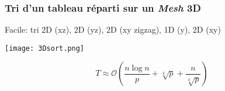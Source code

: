\documentclass[xcolor={x11names,svgnames}]{beamer}
\newcommand{\bigO}[1]{\ensuremath{\mathcal{O}\left( #1 \right)} }
\begin{document}

\begin{frame}[label=tri_3D]
  \frametitle{Tri d'un tableau réparti sur un \emph{Mesh} \alert{3D}}

  \og Facile\fg : tri 2D (xz), 2D (yz), 2D (xy zigzag), 1D (y), 2D (xy)
  
  \texttt{[image: 3Dsort.png]}

  \[
    T \approx \bigO{\frac{n \log n}{p} + \sqrt[3]{p} + \frac{n}{\sqrt[3]{p}}}
  \]
  
\end{frame}

\end{document}
